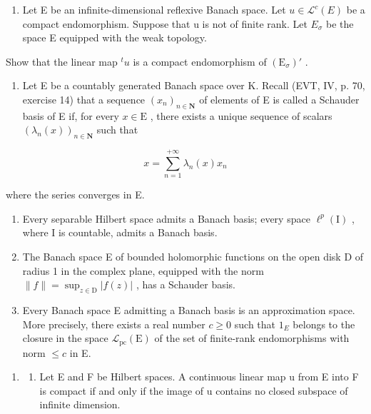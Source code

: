 \begin{enumerate}
\def\labelenumi{\arabic{enumi})}
\setcounter{enumi}{11}
\tightlist
\item
  Let E be an infinite-dimensional reflexive Banach space. Let \(u \in \mathcal{L}^{c}(E)\) be a compact endomorphism. Suppose that u is not of finite rank. Let \(E_{\sigma}\) be the space E equipped with the weak topology.
\end{enumerate}

Show that the linear map \(^{t}u\) is a compact endomorphism of \((\mathrm{E}_{\sigma})'\) .

\begin{enumerate}
\def\labelenumi{\arabic{enumi})}
\setcounter{enumi}{12}
\tightlist
\item
  Let E be a countably generated Banach space over K. Recall (EVT, IV, p. 70, exercise 14) that a sequence \((x_{n})_{n\in \mathbf{N}}\) of elements of E is called a Schauder basis of E if, for every \(x\in \mathrm{E}\) , there exists a unique sequence of scalars \((\lambda_n(x))_{n\in \mathbf{N}}\) such that
\end{enumerate}

\[
x = \sum_ {n = 1} ^ {+ \infty} \lambda_ {n} (x) x _ {n}
\]

where the series converges in E.

\begin{enumerate}
\def\labelenumi{\alph{enumi})}
\item
  Every separable Hilbert space admits a Banach basis; every space \(\ell^{p}(\mathrm{I})\) , where I is countable, admits a Banach basis.
\item
  The Banach space E of bounded holomorphic functions on the open disk D of radius 1 in the complex plane, equipped with the norm \(\| f \| = \sup_{z \in \mathrm{D}} |f(z)|\) , has a Schauder basis.
\item
  Every Banach space E admitting a Banach basis is an approximation space. More precisely, there exists a real number \(c \geqslant 0\) such that \(1_{E}\) belongs to the closure in the space \(\mathcal{L}_{\mathrm{pc}}(\mathrm{E})\) of the set of finite-rank endomorphisms with norm \(\leqslant c\) in E.
\end{enumerate}

\begin{enumerate}
\def\labelenumi{\arabic{enumi})}
\setcounter{enumi}{13}
\tightlist
\item
  \begin{enumerate}
  \def\labelenumii{\alph{enumii})}
  \tightlist
  \item
    Let E and F be Hilbert spaces. A continuous linear map u from E into F is compact if and only if the image of u contains no closed subspace of infinite dimension.
  \end{enumerate}
\end{enumerate}

